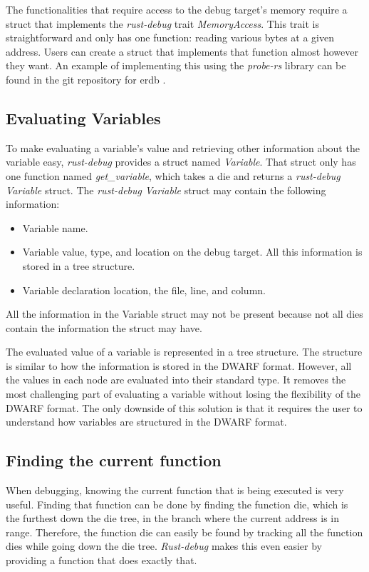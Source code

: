 The functionalities that require access to the debug target's memory require a struct that implements the \emph{rust-debug} trait \emph{MemoryAccess}.
This trait is straightforward and only has one function: reading various bytes at a given address.
Users can create a struct that implements that function almost however they want.
An example of implementing this using the \emph{probe-rs} library can be found in the git repository for \gls{erdb} \cite{erdb}.



\subsection{Evaluating Variables} \label{sec:ievalvar}
To make evaluating a variable's value and retrieving other information about the variable easy, \emph{rust-debug} provides a struct named \emph{Variable}.
That struct only has one function named \emph{get\_variable}, which takes a \gls{die} and returns a \emph{rust-debug} \emph{Variable} struct.
The \emph{rust-debug} \emph{Variable} struct may contain the following information:


\begin{itemize}
  \item Variable name.
  \item Variable value, type, and location on the debug target. All this information is stored in a tree structure.
  \item Variable declaration location, the file, line, and column.
\end{itemize}


All the information in the Variable struct may not be present because not all \glspl{die} contain the information the struct may have.


The evaluated value of a variable is represented in a tree structure.
The structure is similar to how the information is stored in the \gls{DWARF} format.
However, all the values in each node are evaluated into their standard type.
It removes the most challenging part of evaluating a variable without losing the flexibility of the \gls{DWARF} format.
The only downside of this solution is that it requires the user to understand how variables are structured in the \gls{DWARF} format.


\subsection{Finding the current function} \label{sec:funcdie}
When debugging, knowing the current function that is being executed is very useful.
Finding that function can be done by finding the function \gls{die}, which is the furthest down the \gls{die} tree, in the branch where the current address is in range.
Therefore, the function \gls{die} can easily be found by tracking all the function \glspl{die} while going down the \gls{die} tree.
\emph{Rust-debug} makes this even easier by providing a function that does exactly that.



